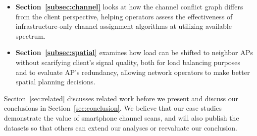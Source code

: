 \begin{itemize}
  \item \textbf{Section~\ref{subsec:channel}} looks at how the channel conflict
    graph differs from the client perspective, helping operators assess the
    effectiveness of infrastructure-only channel assignment algorithms at
    utilizing available spectrum.

  \item \textbf{Section~\ref{subsec:spatial}} examines how load can be
    shifted to neighbor APs without scarifying client's signal quality, both for
    load balancing purposes and to evaluate AP's redundancy, allowing network
    operators to make better spatial planning decisions.
\end{itemize}

Section~\ref{sec:related} discusses related work before we present and
discuss our conclusions in Section~\ref{sec:conclusion}. We believe that our
case studies demonstrate the value of smartphone channel scans, and will
also publish the datasets so that others can extend our analyses or reevaluate
our conclusion.
